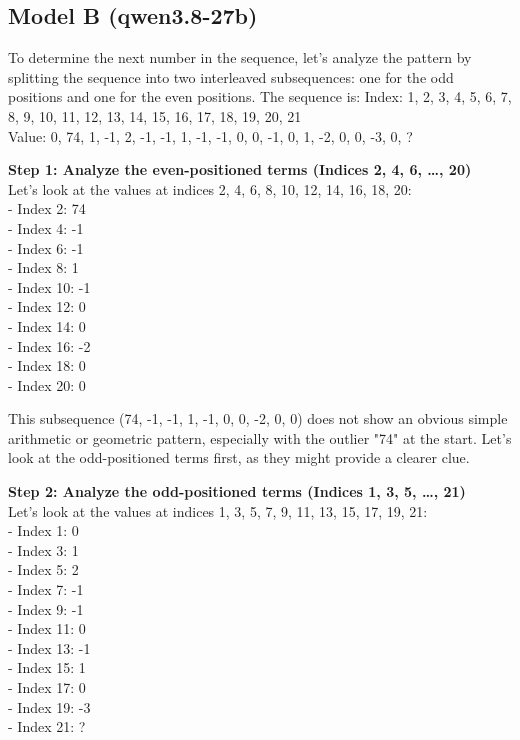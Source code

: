 \documentclass[11pt, a4paper]{article}
\begin{document}
\subsection*{Model B (qwen3.8-27b)}
\noindent
\begin{mdframed}[backgroundcolor=modelBcolor, linecolor=green!20, roundcorner=5pt, innertopmargin=10pt, innerbottommargin=10pt, innerleftmargin=10pt, innerrightmargin=10pt]
To determine the next number in the sequence, let's analyze the pattern by splitting the sequence into two interleaved subsequences: one for the odd positions and one for the even positions. 
The sequence is:
Index: 1, 2, 3, 4, 5, 6, 7, 8, 9, 10, 11, 12, 13, 14, 15, 16, 17, 18, 19, 20, 21 \\
Value: 0, 74, 1, -1, 2, -1, -1, 1, -1, -1, 0, 0, -1, 0, 1, -2, 0, 0, -3, 0, ?

\textbf{Step 1: Analyze the even-positioned terms (Indices 2, 4, 6, \dots, 20)} \\
Let's look at the values at indices 2, 4, 6, 8, 10, 12, 14, 16, 18, 20: \\
- Index 2: 74 \\
- Index 4: -1 \\
- Index 6: -1 \\
- Index 8: 1 \\
- Index 10: -1 \\
- Index 12: 0 \\
- Index 14: 0 \\
- Index 16: -2 \\
- Index 18: 0 \\
- Index 20: 0

This subsequence (74, -1, -1, 1, -1, 0, 0, -2, 0, 0) does not show an obvious simple arithmetic or geometric pattern, especially with the outlier "74" at the start. Let's look at the odd-positioned terms first, as they might provide a clearer clue.

\textbf{Step 2: Analyze the odd-positioned terms (Indices 1, 3, 5, \dots, 21)} \\
Let's look at the values at indices 1, 3, 5, 7, 9, 11, 13, 15, 17, 19, 21: \\
- Index 1: 0 \\
- Index 3: 1 \\
- Index 5: 2 \\
- Index 7: -1 \\
- Index 9: -1 \\
- Index 11: 0 \\
- Index 13: -1 \\
- Index 15: 1 \\
- Index 17: 0 \\
- Index 19: -3 \\
- Index 21: ?


\end{mdframed}
\end{document}
